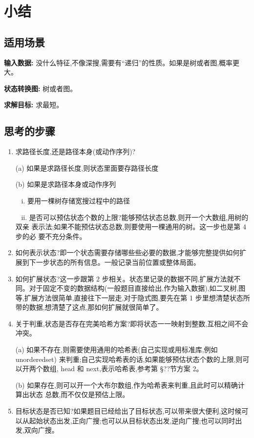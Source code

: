 \documentclass[12pt]{book}
\begin{document}
\section{小结}
\label{sec-10-4}
\subsection{适用场景}
\label{sec-10-4-1}
\textbf{输入数据:} 没什么特征,不像深搜,需要有“递归”的性质。如果是树或者图,概率更大。

\textbf{状态转换图:} 树或者图。

\textbf{求解目标:} 求最短。
\subsection{思考的步骤}
\label{sec-10-4-2}
\begin{enumerate}
\item 求路径长度,还是路径本身(或动作序列)?
\label{sec-10-4-2-1}

(a) 如果是求路径长度,则状态里面要存路径长度

(b) 如果是求路径本身或动作序列

~ i. 要用一棵树存储宽搜过程中的路径

~ ii. 是否可以预估状态个数的上限?能够预估状态总数,则开一个大数组,用树的双亲
表示法;如果不能预估状态总数,则要使用一棵通用的树。这一步也是第 4 步的必
要不充分条件。
\item 如何表示状态?即一个状态需要存储哪些些必要的数据,才能够完整提供如何扩展到下一步状态的所有信息。一般记录当前位置或整体局面。
\label{sec-10-4-2-2}
\item 如何扩展状态?这一步跟第 2 步相关。状态里记录的数据不同,扩展方法就不同。对于固定不变的数据结构(一般题目直接给出,作为输入数据),如二叉树,图等,扩展方法很简单,直接往下一层走,对于隐式图,要先在第 1 步里想清楚状态所带的数据,想清楚了这点,那如何扩展就很简单了。
\label{sec-10-4-2-3}
\item 关于判重,状态是否存在完美哈希方案?即将状态一一映射到整数,互相之间不会冲突。
\label{sec-10-4-2-4}

(a) 如果不存在,则需要使用通用的哈希表(自己实现或用标准库,例如unordered\textunderscore{}set)
来判重;自己实现哈希表的话,如果能够预估状态个数的上限,则可以开两个数组,
head 和 next,表示哈希表,参考第 §??节方案 2。

(b) 如果存在,则可以开一个大布尔数组,作为哈希表来判重,且此时可以精确计算出状态
总数,而不仅仅是预估上限。
\item 目标状态是否已知?如果题目已经给出了目标状态,可以带来很大便利,这时候可以从起始状态出发,正向广搜;也可以从目标状态出发,逆向广搜;也可以同时出发,双向广搜。
\label{sec-10-4-2-5}
\end{enumerate}
\end{document}
